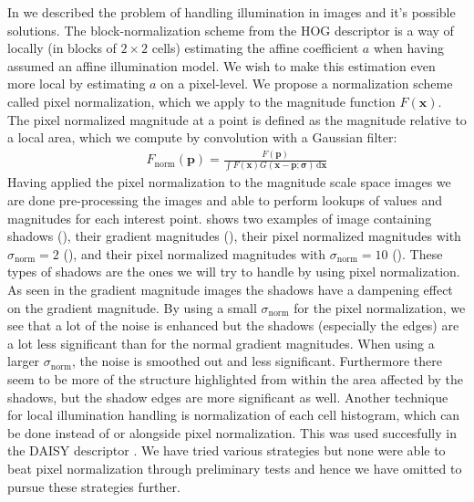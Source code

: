 \documentclass[thesis.tex]{subfiles}
\def\x{\mathbf{x}}
\def\p{\mathbf{p}}
\begin{document}
In  we described the problem of handling illumination in images and it's possible solutions. The block-normalization scheme from the HOG descriptor \cite{dalal2005histograms} is a way of locally (in blocks of $2\times2$ cells) estimating the affine coefficient $a$ when having assumed an affine illumination model. We wish to make this estimation even more local by estimating $a$ on a pixel-level. We propose a normalization scheme called pixel normalization, which we apply to the magnitude function $F(\x)$.
The pixel normalized magnitude at a point is defined as the magnitude relative to a local area, which we compute by convolution with a Gaussian filter:
%
\begin{align}
F_\text{norm}(\p) = \frac{F(\p)}{\int F(\x) G(\x - \p; \boldsymbol{\sigma}) \,\text{d} \x}
\end{align}
%
Having applied the pixel normalization to the magnitude scale space images we are done pre-processing the images and able to perform lookups of values and magnitudes for each interest point.
 shows two examples of image containing shadows (), their gradient magnitudes (), their pixel normalized magnitudes with $\sigma_\text{norm} = 2$ (), and their pixel normalized magnitudes with $\sigma_\text{norm} = 10$ (). These types of shadows are the ones we will try to handle by using pixel normalization. As seen in the gradient magnitude images the shadows have a dampening effect on the gradient magnitude. By using a small $\sigma_\text{norm}$ for the pixel normalization, we see that a lot of the noise is enhanced but the shadows (especially the edges) are a lot less significant than for the normal gradient magnitudes. When using a larger $\sigma_\text{norm}$, the noise is smoothed out and less significant. Furthermore there seem to be more of the structure highlighted from within the area affected by the shadows, but the shadow edges are more significant as well.
%
Another technique for local illumination handling is normalization of each cell histogram, which can be done instead of or alongside pixel normalization. This was used succesfully in the DAISY descriptor \cite{tola2008fast}. We have tried various strategies but none were able to beat pixel normalization through preliminary tests and hence we have omitted to pursue these strategies further.
\end{document}

